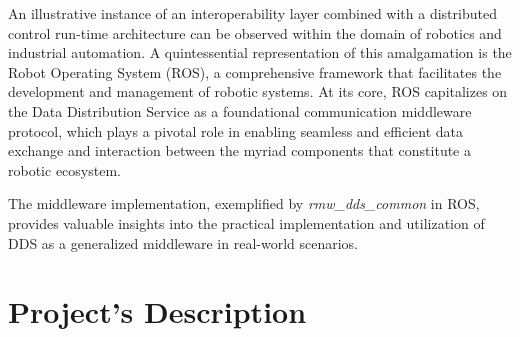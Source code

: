 An illustrative instance of an interoperability layer combined with a distributed control run-time architecture can be observed within the domain of robotics and industrial automation. A quintessential representation of this amalgamation is the Robot Operating System (ROS), a comprehensive framework that facilitates the development and management of robotic systems. At its core, ROS capitalizes on the Data Distribution Service as a foundational communication middleware protocol, which plays a pivotal role in enabling seamless and efficient data exchange and interaction between the myriad components that constitute a robotic ecosystem.

The middleware implementation, exemplified by \emph{rmw\_dds\_common} in ROS, provides valuable insights into the practical implementation and utilization of DDS as a generalized middleware in real-world scenarios.

\section{Project's Description} \label{SEC:pd}


